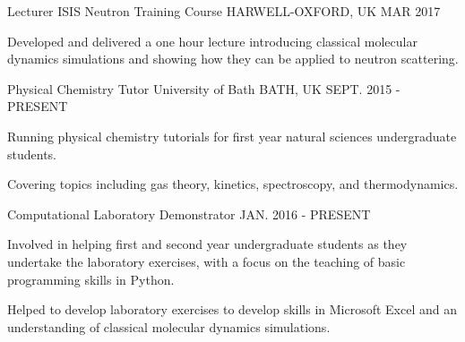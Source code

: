 \begin{cventries}
  \cventry
  	{Lecturer}
    {ISIS Neutron Training Course}
    {HARWELL-OXFORD, UK}
    {MAR 2017}
    {
       \begin{cvitems}
		\item {Developed and delivered a one hour lecture introducing classical molecular dynamics simulations and showing how they can be applied to neutron scattering.}
        \end{cvitems}
    }
  \cventry
    {Physical Chemistry Tutor}
    {University of Bath}
    {BATH, UK}
    {SEPT. 2015 - PRESENT}
    {
      \begin{cvitems}
        \item {Running physical chemistry tutorials for first year natural sciences undergraduate students.}
        \item {Covering topics including gas theory, kinetics, spectroscopy, and thermodynamics.}
      \end{cvitems}
    }
  \cventry
 	{Computational Laboratory Demonstrator}
    {}
    {}
    {JAN. 2016 - PRESENT}
    {
    	\begin{cvitems}
        	\item {Involved in helping first and second year undergraduate students as they undertake the laboratory exercises, with a focus on the teaching of basic programming skills in Python.}
            \item {Helped to develop laboratory exercises to develop skills in Microsoft Excel and an understanding of classical molecular dynamics simulations.}
        \end{cvitems}
    }
\end{cventries}


